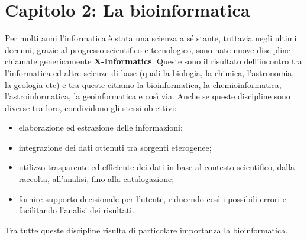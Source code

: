 \chapter{Capitolo 2: La bioinformatica}
Per molti anni l'informatica è stata una scienza a sé stante, tuttavia negli ultimi decenni, grazie al progresso scientifico e tecnologico, sono nate nuove discipline chiamate genericamente \textbf{X-Informatics}. Queste sono il risultato dell'incontro tra l'informatica ed altre scienze di base (quali la biologia, la chimica, l'astronomia, la geologia etc) e tra queste citiamo la bioinformatica, la chemioinformatica, l'astroinformatica, la geoinformatica e così via.
Anche se queste discipline sono diverse tra loro, condividono gli stessi obiettivi:
\begin{itemize}
	\item elaborazione ed estrazione delle informazioni;
	\item integrazione dei dati ottenuti tra sorgenti eterogenee;
	\item utilizzo trasparente ed efficiente dei dati in base al contesto scientifico, dalla raccolta, all'analisi, fino alla catalogazione;
	\item fornire supporto decisionale per l'utente, riducendo così i possibili errori e facilitando l'analisi dei risultati.
\end{itemize}
Tra tutte queste discipline risulta di particolare importanza la bioinformatica.

